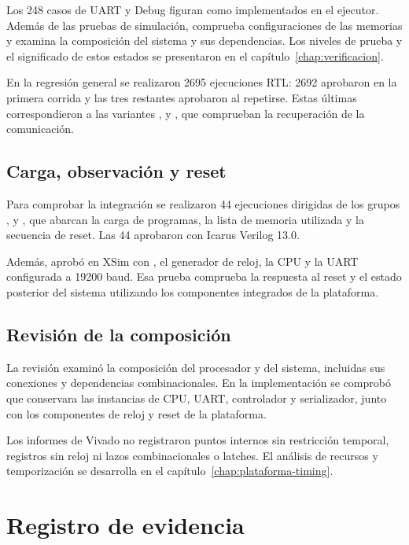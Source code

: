 Los 248 casos de UART y Debug figuran como implementados en el ejecutor. Además
de las pruebas de simulación,  comprueba configuraciones de
las memorias y  examina la composición del sistema y sus
dependencias. Los niveles de prueba y el significado de estos estados se
presentaron en el capítulo~\ref{chap:verificacion}.

En la regresión general se realizaron 2695 ejecuciones RTL: 2692 aprobaron en
la primera corrida y las tres restantes aprobaron al repetirse. Estas últimas
correspondieron a las variantes ,  y
, que comprueban la recuperación de la comunicación.

\subsection{Carga, observación y reset}

Para comprobar la integración se realizaron 44 ejecuciones dirigidas de los
grupos ,  y , que
abarcan la carga de programas, la lista de memoria utilizada y la secuencia de
reset. Las 44 aprobaron con Icarus Verilog 13.0.

Además,  aprobó en XSim con , el
generador de reloj, la CPU y la UART configurada a \num{19200} baud. Esa prueba
comprueba la respuesta al reset y el estado posterior del sistema utilizando
los componentes integrados de la plataforma.

\subsection{Revisión de la composición}

La revisión  examinó la composición del procesador y del
sistema, incluidas sus conexiones y dependencias combinacionales. En la
implementación se comprobó que  conservara las instancias de
CPU, UART, controlador y serializador, junto con los componentes de reloj y
reset de la plataforma.

Los informes de Vivado no registraron puntos internos sin restricción temporal,
registros sin reloj ni lazos combinacionales o latches. El análisis de recursos
y temporización se desarrolla en el capítulo~\ref{chap:plataforma-timing}.

\section{Registro de evidencia}

